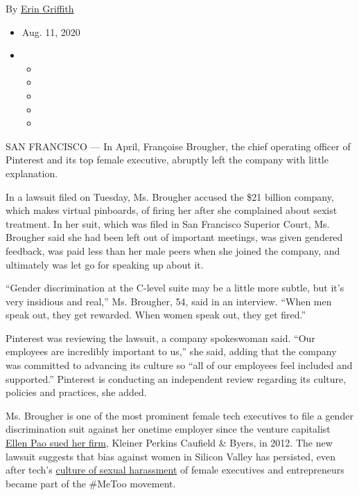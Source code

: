 By \href{https://www.nytimes3xbfgragh.onion/by/erin-griffith}{Erin
Griffith}

\begin{itemize}
\item
  Aug. 11, 2020
\item
  \begin{itemize}
  \item
  \item
  \item
  \item
  \item
  \end{itemize}
\end{itemize}

SAN FRANCISCO --- In April, Françoise Brougher, the chief operating
officer of Pinterest and its top female executive, abruptly left the
company with little explanation.

In a lawsuit filed on Tuesday, Ms. Brougher accused the \$21 billion
company, which makes virtual pinboards, of firing her after she
complained about sexist treatment. In her suit, which was filed in San
Francisco Superior Court, Ms. Brougher said she had been left out of
important meetings, was given gendered feedback, was paid less than her
male peers when she joined the company, and ultimately was let go for
speaking up about it.

``Gender discrimination at the C-level suite may be a little more
subtle, but it's very insidious and real,'' Ms. Brougher, 54, said in an
interview. ``When men speak out, they get rewarded. When women speak
out, they get fired.''

Pinterest was reviewing the lawsuit, a company spokeswoman said. ``Our
employees are incredibly important to us,'' she said, adding that the
company was committed to advancing its culture so ``all of our employees
feel included and supported.'' Pinterest is conducting an independent
review regarding its culture, policies and practices, she added.

Ms. Brougher is one of the most prominent female tech executives to file
a gender discrimination suit against her onetime employer since the
venture capitalist
\href{https://www.nytimes3xbfgragh.onion/2015/02/23/technology/ellen-pao-suit-against-kleiner-perkins-heads-to-trial-with-big-potential-implications.html}{Ellen
Pao sued her firm}, Kleiner Perkins Caufield \& Byers, in 2012. The new
lawsuit suggests that bias against women in Silicon Valley has
persisted, even after tech's
\href{https://www.nytimes3xbfgragh.onion/2017/06/30/technology/women-entrepreneurs-speak-out-sexual-harassment.html}{culture
of sexual harassment} of female executives and entrepreneurs became part
of the \#MeToo movement.

